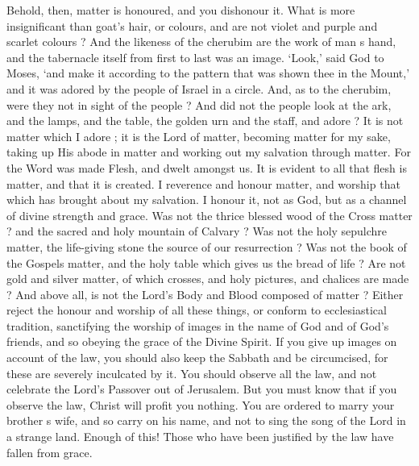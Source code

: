 \documentclass[10pt]{book}
\newcommand{\switchGreek}[1][]{\selectlanguage{polutonikogreek} \switchcolumn*[#1]}
\begin{document}
\begin{paracol}{2}
Behold, then, matter is honoured, and you 
dishonour it. What is more insignificant than 
goat's hair, or colours, and are not violet and 
purple and scarlet colours ? And the likeness 
of the cherubim are the work of man s hand, 
and the tabernacle itself from first to last was 
an image. `Look,' said God to Moses, `and 
make it according to the pattern that was 
shown thee in the Mount,' and it was adored by 
the people of Israel in a circle. And, as to the 
cherubim, were they not in sight of the people ? 
And did not the people look at the ark, and 
the lamps, and the table, the golden urn and 
the staff, and adore ? It is not matter which I 
adore ; it is the Lord of matter, becoming 
matter for my sake, taking up His abode in 
matter and working out my salvation through 
matter. For the Word was made Flesh, and 
dwelt amongst us. It is evident to all that 
flesh is matter, and that it is created. I 
reverence and honour matter, and worship that 
which has brought about my salvation. I 
honour it, not as God, but as a channel of 
divine strength and grace. Was not the thrice 
blessed wood of the Cross matter ? and the 
sacred and holy mountain of Calvary ? Was 
not the holy sepulchre matter, the life-giving 
stone the source of our resurrection ? Was not 
the book of the Gospels matter, and the holy table 
which gives us the bread of life ? Are not gold 
and silver matter, of which crosses, and holy 
pictures, and chalices are made ? And above 
all, is not the Lord's Body and Blood composed 
of matter ? Either reject the honour and 
worship of all these things, or conform to 
ecclesiastical tradition, sanctifying the worship 
of images in the name of God and of God's 
friends, and so obeying the grace of the Divine 
Spirit. If you give up images on account of 
the law, you should also keep the Sabbath and 
be circumcised, for these are severely inculcated 
by it. You should observe all the law, and not 
celebrate the Lord's Passover out of Jerusalem. 
But you must know that if you observe the 
law, Christ will profit you nothing. You are 
ordered to marry your brother s wife, and so 
carry on his name, and not to sing the song of 
the Lord in a strange land. Enough of this! 
Those who have been justified by the law have 
fallen from grace. 

\switchGreek


\end{paracol}
\end{document}
